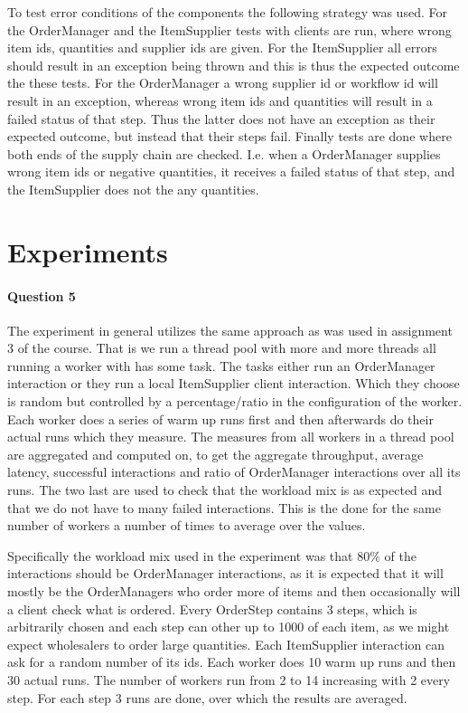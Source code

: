 \documentclass[a4paper, 11pt]{article}
\begin{document}
To test error conditions of the components the following strategy was used. For the OrderManager and the ItemSupplier tests with clients are run, where wrong item ids, quantities and supplier ids are given. For the ItemSupplier all errors should result in an exception being thrown and this is thus the expected outcome the these tests. For the OrderManager a wrong supplier id or workflow id will result in an exception, whereas wrong item ids and quantities will result in a failed status of that step. Thus the latter does not have an exception as their expected outcome, but instead that their steps fail. Finally tests are done where both ends of the supply chain are checked. I.e. when a OrderManager supplies wrong item ids or negative quantities, it receives a failed status of that step, and the ItemSupplier does not the any quantities.



\section{Experiments} %
\label{sec:experiments}

\paragraph{Question 5} %
\label{par:question_5}

The experiment in general utilizes the same approach as was used in assignment 3 of the course. That is we run a thread pool with more and more threads all running a worker with has some task. The tasks either run an OrderManager interaction or they run a local ItemSupplier client interaction. Which they choose is random but controlled by a percentage/ratio in the configuration of the worker. Each worker does a series of warm up runs first and then afterwards do their actual runs which they measure. The measures from all workers in a thread pool are aggregated and computed on, to get the aggregate throughput, average latency, successful interactions and ratio of OrderManager interactions over all its runs. The two last are used to check that the workload mix is as expected and that we do not have to many failed interactions. This is the done for the same number of workers a number of times to average over the values.

Specifically the workload mix used in the experiment was that 80\% of the interactions should be OrderManager interactions, as it is expected that it will mostly be the OrderManagers who order more of items and then occasionally will a client check what is ordered. Every OrderStep contains 3 steps, which is arbitrarily chosen and each step can other up to 1000 of each item, as we might expect wholesalers to order large quantities. Each ItemSupplier interaction can ask for a random number of its ids. Each worker does 10 warm up runs and then 30 actual runs. The number of workers run from 2 to 14 increasing with 2 every step. For each step 3 runs are done, over which the results are averaged.
\end{document}
